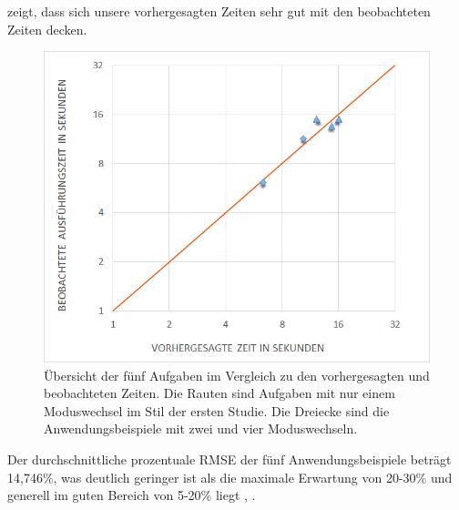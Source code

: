  zeigt, dass sich unsere vorhergesagten Zeiten sehr gut mit den beobachteten Zeiten decken. 
\begin{figure}[ht]
	\centering
		\includegraphics[width=1\textwidth]{img/predictedVsObserveredData.jpg}
	\caption[Übersicht der fünf Aufgaben im Vergleich zu den vorhergesagten und beobachteten Zeiten]{Übersicht der fünf Aufgaben im Vergleich zu den vorhergesagten und beobachteten Zeiten. Die Rauten sind Aufgaben mit nur einem Moduswechsel im Stil der ersten Studie. Die Dreiecke sind die Anwendungsbeispiele mit zwei und vier Moduswechseln.}
	\label{fig:predictedVsObserveredData}
\end{figure}

Der durchschnittliche prozentuale RMSE der fünf Anwendungsbeispiele beträgt 14,746\%, was deutlich geringer ist als die maximale Erwartung von 20-30\% \citep{Card_1980} und generell im guten Bereich von 5-20\% liegt \citep{Luo_2005}, \citep{Teo:2006}. 


